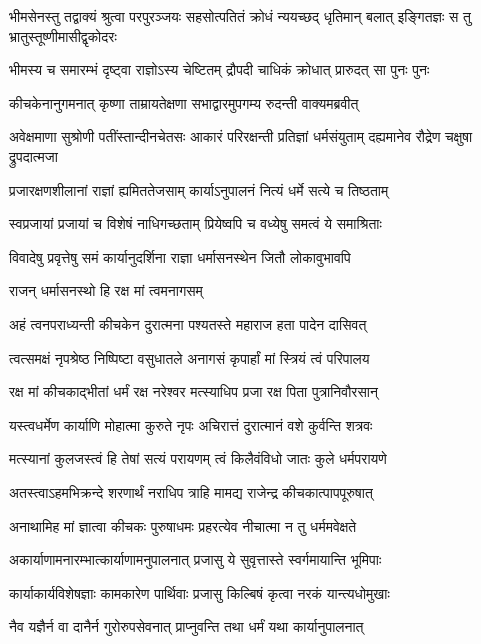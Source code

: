 \threelineshloka
{भीमसेनस्तु तद्वाक्यं श्रुत्वा परपुरञ्जयः}
{सहसोत्पतितं क्रोधं न्ययच्छद् धृतिमान् बलात्}
{इङ्गितज्ञः स तु भ्रातुस्तूष्णीमासीद्वृकोदरः}


\twolineshloka
{भीमस्य च समारम्भं दृष्ट्वा राज्ञोऽस्य चेष्टितम्}
{द्रौपदी चाधिकं क्रोधात् प्रारुदत् सा पुनः पुनः}


\twolineshloka
{कीचकेनानुगमनात् कृष्णा ताम्रायतेक्षणा}
{सभाद्वारमुपगम्य रुदन्ती वाक्यमब्रवीत्}


\threelineshloka
{अवेक्षमाणा सुश्रोणी पतींस्तान्दीनचेतसः}
{आकारं परिरक्षन्ती प्रतिज्ञां धर्मसंयुताम्}
{दह्यमानेव रौद्रेण चक्षुषा द्रुपदात्मजा}


\twolineshloka
{प्रजारक्षणशीलानां राज्ञां ह्यमिततेजसाम्}
{कार्याऽनुपालनं नित्यं धर्मे सत्ये च तिष्ठताम्}


\twolineshloka
{स्वप्रजायां प्रजायां च विशेषं नाधिगच्छताम्}
{प्रियेष्वपि च वध्येषु समत्वं ये समाश्रिताः}


\twolineshloka
{विवादेषु प्रवृत्तेषु समं कार्यानुदर्शिना}
{राज्ञा धर्मासनस्थेन जितौ लोकावुभावपि}


\onelineshloka
{राजन् धर्मासनस्थो हि रक्ष मां त्वमनागसम्}


\twolineshloka
{अहं त्वनपराध्यन्ती कीचकेन दुरात्मना}
{पश्यतस्ते महाराज हता पादेन दासिवत्}


\twolineshloka
{त्वत्समक्षं नृपश्रेष्ठ निष्पिष्टा वसुधातले}
{अनागसं कृपार्हां मां स्त्रियं त्वं परिपालय}


\twolineshloka
{रक्ष मां कीचकाद्भीतां धर्मं रक्ष नरेश्वर}
{मत्स्याधिप प्रजा रक्ष पिता पुत्रानिवौरसान्}


\twolineshloka
{यस्त्वधर्मेण कार्याणि मोहात्मा कुरुते नृपः}
{अचिरात्तं दुरात्मानं वशे कुर्वन्ति शत्रवः}


\twolineshloka
{मत्स्यानां कुलजस्त्वं हि तेषां सत्यं परायणम्}
{त्वं किलैवंविधो जातः कुले धर्मपरायणे}


\twolineshloka
{अतस्त्वाऽहमभिक्रन्दे शरणार्थं नराधिप}
{त्राहि मामद्य राजेन्द्र कीचकात्पापपूरुषात्}


\twolineshloka
{अनाथामिह मां ज्ञात्वा कीचकः पुरुषाधमः}
{प्रहरत्येव नीचात्मा न तु धर्ममवेक्षते}


\twolineshloka
{अकार्याणामनारम्भात्कार्याणामनुपालनात्}
{प्रजासु ये सुवृत्तास्ते स्वर्गमायान्ति भूमिपाः}


\twolineshloka
{कार्याकार्यविशेषज्ञाः कामकारेण पार्थिवाः}
{प्रजासु किल्बिषं कृत्वा नरकं यान्त्यधोमुखाः}


\twolineshloka
{नैव यज्ञैर्न वा दानैर्न गुरोरुपसेवनात्}
{प्राप्नुवन्ति तथा धर्मं यथा कार्यानुपालनात्}


